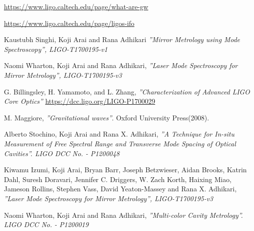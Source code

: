 \documentclass[colorlinks=true,pdfstartview=FitV,linkcolor=blue,
            citecolor=red,urlcolor=magenta]{ligodoc}
\begin{document}
\begin{thebibliography}{9}

       \url{https://www.ligo.caltech.edu/page/what-are-gw}
       
       \url{https://www.ligo.caltech.edu/page/ligos-ifo}
 
     Kaustubh Singhi, Koji Arai and Rana Adhikari
      \emph{''Mirror Metrology using Mode
Spectroscopy'', LIGO-T1700195-v1}
	
    Naomi Wharton, Koji Arai and Rana Adhikari,
      \emph{''Laser Mode Spectroscopy for Mirror Metrology'', LIGO-T1700195-v3}
	
     G. Billingsley, H. Yamamoto, and L. Zhang,
      \emph{''Characterization of Advanced LIGO Core
Optics''}
 \url{https://dcc.ligo.org/LIGO-P1700029}
	
	  M. Maggiore,
	  \emph{''Gravitational waves''}.
	 Oxford University Press(2008).    
	 
   Alberto Stochino, Koji Arai and Rana X. Adhikari,
      \emph{''A Technique for In-situ Measurement
of Free Spectral Range and Transverse Mode Spacing of Optical Cavities''.
LIGO DCC No. - P1200048}
      
   Kiwamu Izumi, Koji Arai, Bryan Barr, Joseph Betzwieser, Aidan Brooks, Katrin Dahl,
Suresh Doravari, Jennifer C. Driggers, W. Zach Korth, Haixing Miao, Jameson Rollins,
Stephen Vass, David Yeaton-Massey and Rana X. Adhikari,
      \emph{''Laser Mode Spectroscopy for Mirror Metrology'', LIGO-T1700195-v3}
      
    Naomi Wharton, Koji Arai and Rana Adhikari,
      \emph{''Multi-color Cavity Metrology''.
LIGO DCC No. - P1200019}
      
   
 
\end{thebibliography} %
\end{document}
